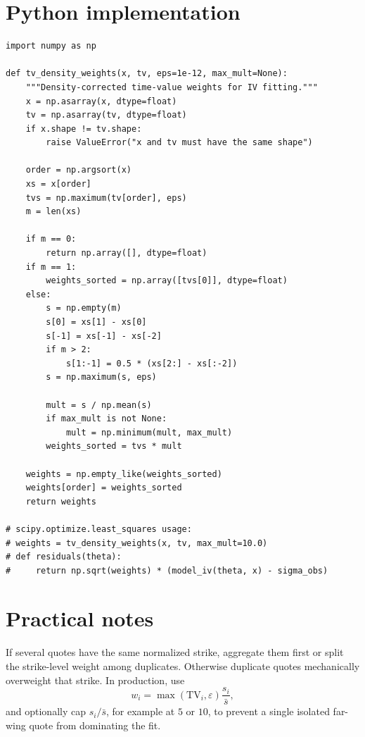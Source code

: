 \documentclass[9pt,a4paper]{extarticle}
\begin{document}
\section*{Python implementation}
\begin{lstlisting}
import numpy as np

def tv_density_weights(x, tv, eps=1e-12, max_mult=None):
    """Density-corrected time-value weights for IV fitting."""
    x = np.asarray(x, dtype=float)
    tv = np.asarray(tv, dtype=float)
    if x.shape != tv.shape:
        raise ValueError("x and tv must have the same shape")

    order = np.argsort(x)
    xs = x[order]
    tvs = np.maximum(tv[order], eps)
    m = len(xs)

    if m == 0:
        return np.array([], dtype=float)
    if m == 1:
        weights_sorted = np.array([tvs[0]], dtype=float)
    else:
        s = np.empty(m)
        s[0] = xs[1] - xs[0]
        s[-1] = xs[-1] - xs[-2]
        if m > 2:
            s[1:-1] = 0.5 * (xs[2:] - xs[:-2])
        s = np.maximum(s, eps)

        mult = s / np.mean(s)
        if max_mult is not None:
            mult = np.minimum(mult, max_mult)
        weights_sorted = tvs * mult

    weights = np.empty_like(weights_sorted)
    weights[order] = weights_sorted
    return weights

# scipy.optimize.least_squares usage:
# weights = tv_density_weights(x, tv, max_mult=10.0)
# def residuals(theta):
#     return np.sqrt(weights) * (model_iv(theta, x) - sigma_obs)
\end{lstlisting}

\section*{Practical notes}
If several quotes have the same normalized strike, aggregate them first or split the strike-level weight among duplicates. Otherwise duplicate quotes mechanically overweight that strike. In production, use
\[
  w_i=\max(\mathrm{TV}_i,\varepsilon)\frac{s_i}{\bar{s}},
\]
and optionally cap $s_i/\bar{s}$, for example at $5$ or $10$, to prevent a single isolated far-wing quote from dominating the fit.
\end{document}
